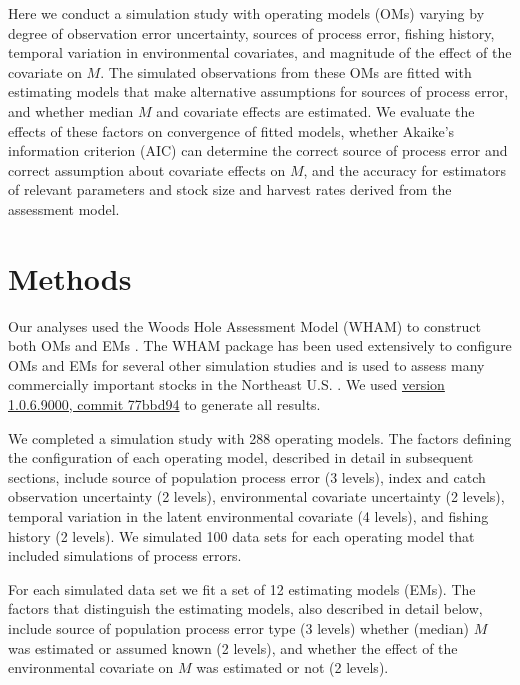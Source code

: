 \documentclass[
  12pt,
]{article}
\begin{document}
Here we conduct a simulation study with operating models (OMs) varying by degree of observation error uncertainty, sources of process error, fishing history, temporal variation in environmental covariates, and magnitude of the effect of the covariate on \(M\). The simulated observations from these OMs are fitted with estimating models that make alternative assumptions for sources of process error, and whether median \(M\) and covariate effects are estimated. We evaluate the effects of these factors on convergence of fitted models, whether Akaike's information criterion (AIC) can determine the correct source of process error and correct assumption about covariate effects on \(M\), and the accuracy for estimators of relevant parameters and stock size and harvest rates derived from the assessment model.

\hypertarget{methods}{%
\section*{Methods}\label{methods}}

Our analyses used the Woods Hole Assessment Model (WHAM) to construct both OMs and EMs \citep{millerstock20, stockmiller21, milleretal_inreview}. The WHAM package has been used extensively to configure OMs and EMs for several other simulation studies \citep{stocketal21, legaultetal23, lietal24, brittenetal_inreview, lietal_inreview_a} and is used to assess many commercially important stocks in the Northeast U.S. \citep[e.g.,][]{nefsc22, nefsc22a, nefsc24}. We used \href{https://github.com/timjmiller/wham/tree/77bbd946e4881216a439933473d1c58b21c270c3}{version 1.0.6.9000, commit 77bbd94} to generate all results.

We completed a simulation study with 288 operating models. The factors defining the configuration of each operating model, described in detail in subsequent sections, include source of population process error (3 levels), index and catch observation uncertainty (2 levels), environmental covariate uncertainty (2 levels), temporal variation in the latent environmental covariate (4 levels), and fishing history (2 levels). We simulated 100 data sets for each operating model that included simulations of process errors.

For each simulated data set we fit a set of 12 estimating models (EMs). The factors that distinguish the estimating models, also described in detail below, include source of population process error type (3 levels) whether (median) \(M\) was estimated or assumed known (2 levels), and whether the effect of the environmental covariate on \(M\) was estimated or not (2 levels).
\end{document}
